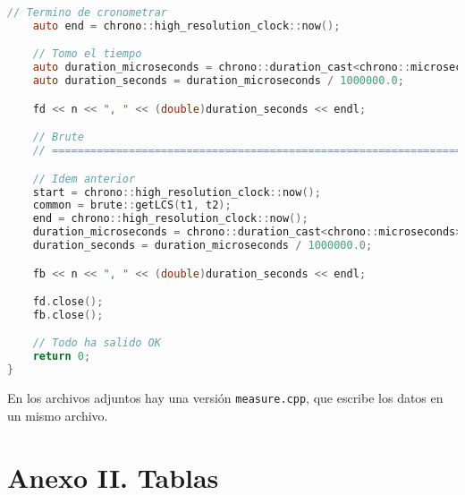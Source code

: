 \documentclass[10pt, a4paper]{article}
\theoremstyle{theorem-style}
\theoremstyle{theorem-style}
\theoremstyle{definition-style}
\theoremstyle{remark-style}
\theoremstyle{example-style}
\theoremstyle{definition-style}
\theoremstyle{remark-style}
\begin{document}
\begin{lstlisting}[language=C]
    // Termino de cronometrar
    auto end = chrono::high_resolution_clock::now();

    // Tomo el tiempo
	auto duration_microseconds = chrono::duration_cast<chrono::microseconds>(end - start).count(); 
    auto duration_seconds = duration_microseconds / 1000000.0;

    fd << n << ", " << (double)duration_seconds << endl;

    // Brute
    // =========================================================================

    // Idem anterior
    start = chrono::high_resolution_clock::now();
    common = brute::getLCS(t1, t2);
    end = chrono::high_resolution_clock::now();
    duration_microseconds = chrono::duration_cast<chrono::microseconds>(end - start).count(); 
    duration_seconds = duration_microseconds / 1000000.0;

    fb << n << ", " << (double)duration_seconds << endl;

    fd.close();
    fb.close();

    // Todo ha salido OK
    return 0;
}
\end{lstlisting}

En los archivos adjuntos hay una versión \texttt{measure.cpp}, que escribe los datos en un mismo archivo.

\pagebreak
\section*{Anexo II. Tablas}
\vspace{4cm}
\begin{center}
\end{center}
\end{document}
